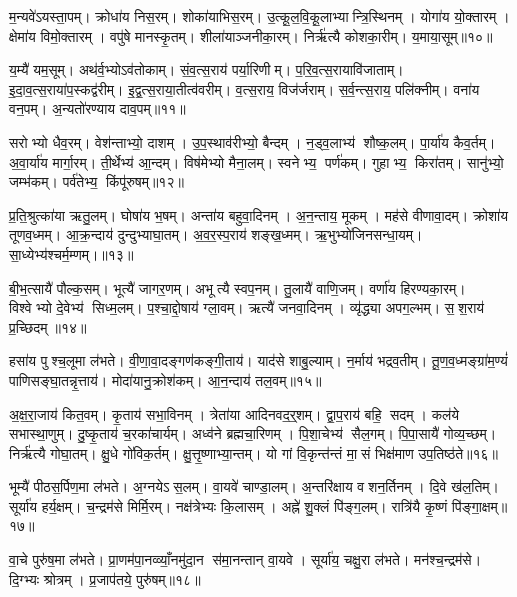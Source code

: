 म॒न्यवे॑ऽयस्ता॒पम्। क्रोधा॑य निस॒रम्। शोका॑याभिस॒रम्। उ॒त्कू॒ल॒वि॒कू॒लाभ्यान्त्रि॒स्थिनम्। योगा॑य यो॒क्तारम्। क्षेमा॑य विमो॒क्तारम्। वपु॑षे मानस्कृ॒तम्। शीला॑याञ्जनीका॒रम्। निर्\mbox{}ऋ॑त्यै कोशका॒रीम्। य॒माया॒सूम्॥१०॥

य॒म्यै॑ यम॒सूम्। अथ॑र्व॒भ्योऽव॑तोकाम्। सं॒व॒त्स॒राय॑ पर्या॒रिणीम्। प॒रि॒व॒त्स॒रायावि॑जाताम्। इ॒दा॒व॒त्स॒राया॑प॒स्कद्व॑रीम्। इ॒द्व॒त्स॒राया॒तीत्व॑वरीम्। व॒त्स॒राय॒ विज॑र्जराम्। स॒र्व॒न्त्स॒राय॒ पलि॑क्नीम्। वना॑य वन॒पम्। अ॒न्यतो॑रण्याय दाव॒पम्॥११॥

सरोभ्यो धैव॒रम्। वेश॑न्ताभ्यो॒ दाशम्। उ॒प॒स्थाव॑रीभ्यो॒ बैन्दम्। न॒ड्व॒लाभ्य॑ शौष्क॒लम्। पा॒र्या॑य कैव॒र्तम्। अ॒वा॒र्या॑य मार्गा॒रम्। ती॒र्थेभ्य॑ आ॒न्दम्। विष॑मेभ्यो मैना॒लम्। स्वनेभ्य॒ पर्ण॑कम्। गुहाभ्य॒ किरा॑तम्। सानु॑भ्यो॒ जम्भ॑कम्। पर्व॑तेभ्य॒ किंपू॑रुषम्॥१२॥

प्र॒ति॒श्रुत्का॑या ऋतु॒लम्। घोषा॑य भ॒षम्। अन्ता॑य बहुवा॒दिनम्। अ॒न॒न्ताय॒ मूकम्। मह॑से वीणावा॒दम्। क्रोशा॑य तूणव॒ध्मम्। आ॒क्र॒न्दाय॑ दुन्दुभ्याघा॒तम्। अ॒व॒र॒स्प॒राय॑ शङ्ख॒ध्मम्। ऋ॒भुभ्यो॑जिनसन्धा॒यम्। सा॒ध्येभ्य॑श्चर्म॒म्णम्।॥१३॥

बी॒भ॒त्सायै॑ पौल्क॒सम्। भूत्यै॑ जागर॒णम्। अभूत्यै स्वप॒नम्। तु॒लायै॑ वाणि॒जम्। वर्णा॑य हिरण्यका॒रम्। विश्वेभ्यो दे॒वेभ्य॑ सिध्म॒लम्। प॒श्चा॒द्दो॒षाय॑ ग्ला॒वम्। ऋत्यै॑ जनवा॒दिनम्। व्यृ॑द्ध्या अपग॒ल्भम्। स॒श॒राय॑ प्र॒च्छिदम्॥१४॥

हसा॑य पुश्च॒लूमा ल॑भते। वी॒णा॒वा॒दङ्गण॑कङ्गी॒ताय॑। याद॑से शाबु॒ल्याम्। न॒र्माय॑ भद्रव॒तीम्। तू॒ण॒व॒ध्मङ्ग्रा॑म॒ण्यं॑ पाणिसङ्घा॒तन्नृ॒त्ताय॑। मोदा॑यानु॒क्रोश॑कम्। आ॒न॒न्दाय॑ तल॒वम्॥१५॥

अ॒क्ष॒रा॒जाय॑ कित॒वम्। कृ॒ताय॑ सभा॒विनम्। त्रेता॑या आदिनवद॒र्॒शम्। द्वा॒प॒राय॑ बहि॒ सदम्। कल॑ये सभास्था॒णुम्। दु॒ष्कृ॒ताय॑ च॒रका॑चार्यम्। अध्व॑ने ब्रह्मचा॒रिणम्। पि॒शा॒चेभ्य॑ सैल॒गम्। पि॒पा॒सायै॑ गोव्य॒च्छम्। निर्\mbox{}ऋ॑त्यै गोघा॒तम्। क्षु॒धे गो॑विक॒र्तम्। क्षु॒त्तृ॒ष्णाभ्या॒न्तम्। यो गां वि॒कृन्त॑न्तं मा॒सं भिक्ष॑माण उप॒तिष्ठ॑ते॥१६॥

भूम्यै॑ पीठस॒र्पिण॒मा ल॑भते। अ॒ग्नयेऽस॒लम्। वा॒यवे॑ चाण्डा॒लम्। अ॒न्तरि॑क्षाय वशन॒र्तिनम्। दि॒वे ख॑ल॒तिम्। सूर्या॑य हर्य॒क्षम्। च॒न्द्रम॑से मिर्मि॒रम्। नक्ष॑त्रेभ्यः कि॒लासम्। अह्ने॑ शु॒क्लं पि॑ङ्ग॒लम्। रात्रि॑यै कृ॒ष्णं पि॑ङ्गा॒क्षम्॥१७॥

वा॒चे पुरु॑ष॒मा ल॑भते। प्रा॒णम॑पा॒नव्व्याँ॒नमु॑दा॒न स॑मा॒नन्तान् वा॒यवे। सूर्या॑य॒ चक्षु॒रा ल॑भते। मन॑श्च॒न्द्रम॑से। दि॒ग्भ्यः श्रोत्रम्। प्र॒जाप॑तये॒ पुरु॑षम्॥१८॥

